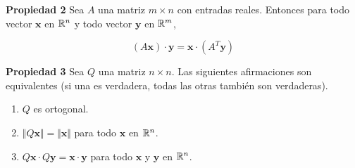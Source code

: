 \begin{frame}%

	\begin{prop}{\textbf{Propiedad 2}}
	\justifying
	Sea $A$ una matriz $m\times n$ con entradas reales. Entonces para todo vector $\mathbf{x}$ en $\mathbb{R}^n$ y 
	todo vector $\mathbf{y}$ en $\mathbb{R}^m$,
	
	\vspace{-2mm}
	\[
	\left(A\mathbf{x}\right)\cdot \mathbf{y} = \mathbf{x}\cdot \left(A^T\mathbf{y}\right)
	\]
\end{prop}	

\begin{prop}{\textbf{Propiedad 3}}
	\justifying
	Sea $Q$ una matriz $n\times n$. Las siguientes afirmaciones son equivalentes (si una es verdadera, todas
	las otras también son verdaderas). 
	\begin{enumerate}[$a$]\justifying 
		\item $Q$ es ortogonal.
		\item $\Vert Q\mathbf{x}\Vert = \Vert \mathbf{x}\Vert $ para todo $\mathbf{x} $ en $\mathbb{R}^n$.
		\item $ Q\mathbf{x}\cdot Q\mathbf{y} = \mathbf{x}\cdot \mathbf{y} $ para todo 
		$\mathbf{x}$ y $\mathbf{y}$ en $\mathbb{R}^n$.
	\end{enumerate}
\end{prop}	

%	

\end{frame}


\subsection{}

